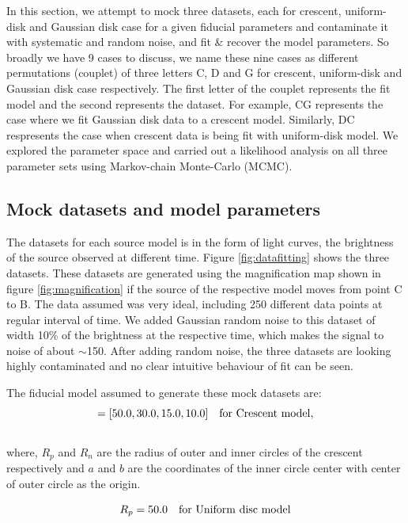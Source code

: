 In this section, we attempt to mock three datasets, each for crescent, uniform-disk and Gaussian disk case for a given fiducial parameters and contaminate it with systematic and random noise, and fit \& recover the model parameters. So broadly we have 9 cases to discuss, we name these nine cases as different permutations (couplet) of three letters C, D and G for crescent, uniform-disk and Gaussian disk case respectively. The first letter of the couplet represents the fit model and the second represents the dataset. For example, CG represents the case where we fit Gaussian disk data to a crescent model. Similarly, DC respresents the case when crescent data is being fit with uniform-disk model. We explored the parameter space and carried out a likelihood analysis on all three parameter sets using Markov-chain Monte-Carlo (MCMC).

\subsection{Mock datasets and model parameters}
The datasets for each source model is in the form of light curves, the brightness of the source observed at different time. Figure \ref{fig:datafitting} shows the three datasets. These datasets are generated using the magnification map shown in figure \ref{fig:magnification} if the source of the respective model moves from point C to B. The data assumed was very  ideal, including 250 different data points at regular interval of time. We added Gaussian random noise to this dataset of width 10\% of the brightness at the respective time, which makes the signal to noise of about $\sim$150. After adding random noise, the three datasets are looking highly contaminated and no clear intuitive behaviour of fit can be seen. 

The fiducial model assumed to generate these mock datasets are:
\begin{equation}
	[R_p, R_n, a, b] = [50.0, 30.0, 15.0, 10.0]  \ \ \ \rm{for\ Crescent\ model},
	\label{eqn:cp}
\end{equation}
\\
where, $R_p$ and $R_n$ are the radius of outer and inner circles of the crescent respectively and $a$ and $b$ are the coordinates of the inner circle center with center of outer circle as the origin.

\begin{equation}
	R_p = 50.0 \ \ \ \rm{for\ Uniform\ disc\ model}
\end{equation}

